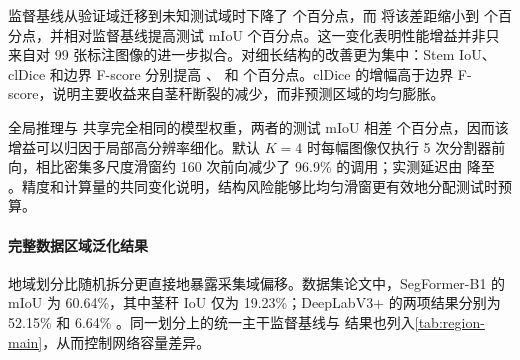 \begin{table}[!htbp]
\centering
\caption{GWFSS 少标注跨域协议上的定量比较。mIoU、Stem IoU 和 clDice 的单位为百分数，``--'' 表示原论文未报告相应结果，前向次数按每张 $512\times512$ 测试图像统计。}
\label{tab:small-label-main}
\end{table}

监督基线从验证域迁移到未知测试域时下降了  个百分点，而 \METHOD 将该差距缩小到  个百分点，并相对监督基线提高测试 mIoU  个百分点。这一变化表明性能增益并非只来自对 99 张标注图像的进一步拟合。对细长结构的改善更为集中：Stem IoU、clDice 和边界 F-score 分别提高 、 和  个百分点。clDice 的增幅高于边界 F-score，说明主要收益来自茎秆断裂的减少，而非预测区域的均匀膨胀。

全局推理与 \BAZR 共享完全相同的模型权重，两者的测试 mIoU 相差  个百分点，因而该增益可以归因于局部高分辨率细化。默认 $K=4$ 时每幅图像仅执行 5 次分割器前向，相比密集多尺度滑窗约 160 次前向减少了 96.9\% 的调用；实测延迟由  降至 。精度和计算量的共同变化说明，结构风险能够比均匀滑窗更有效地分配测试时预算。

\paragraph{完整数据区域泛化结果}
地域划分比随机拆分更直接地暴露采集域偏移。数据集论文中，SegFormer-B1 的 mIoU 为 60.64\%，其中茎秆 IoU 仅为 19.23\%；DeepLabV3+ 的两项结果分别为 52.15\% 和 6.64\% \citep{wang2025gwfss}。同一划分上的统一主干监督基线与 \METHOD 结果也列入\cref{tab:region-main}，从而控制网络容量差异。

